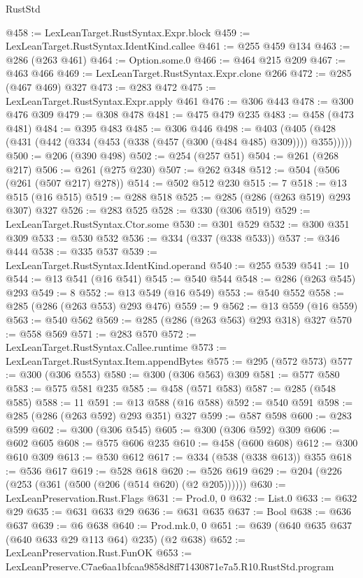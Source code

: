\begin{lexlean}{RustStd}
\begin{coremodule}
@458 := LexLeanTarget.RustSyntax.Expr.block
@459 := LexLeanTarget.RustSyntax.IdentKind.callee
@461 := @255 @459 @134
@463 := @286 (@263 @461)
@464 := Option.some.{0}
@466 := @464 @215 @209
@467 := @463 @466
@469 := LexLeanTarget.RustSyntax.Expr.clone @266
@472 := @285 (@467 @469) @327
@473 := @283 @472
@475 := LexLeanTarget.RustSyntax.Expr.apply @461
@476 := @306 @443
@478 := @300 @476 @309
@479 := @308 @478
@481 := @475 @479 @235
@483 := @458 (@473 @481)
@484 := @395 @483
@485 := @306 @446
@498 := @403 (@405 (@428 (@431 (@442 (@334 (@453 (@338 (@457 (@300 (@484 @485) @309)))) @355)))))
@500 := @206 (@390 @498)
@502 := @254 (@257 @51)
@504 := @261 (@268 @217)
@506 := @261 (@275 @230)
@507 := @262 @348
@512 := @504 (@506 (@261 (@507 @217) @278))
@514 := @502 @512 @230
@515 := 7
@518 := @13 @515 (@16 @515)
@519 := @288 @518
@525 := @285 (@286 (@263 @519) @293 @307) @327
@526 := @283 @525
@528 := @330 (@306 @519)
@529 := LexLeanTarget.RustSyntax.Ctor.some
@530 := @301 @529
@532 := @300 @351 @309
@533 := @530 @532
@536 := @334 (@337 (@338 @533))
@537 := @346 @444
@538 := @335 @537
@539 := LexLeanTarget.RustSyntax.IdentKind.operand
@540 := @255 @539
@541 := 10
@544 := @13 @541 (@16 @541)
@545 := @540 @544
@548 := @286 (@263 @545) @293
@549 := 8
@552 := @13 @549 (@16 @549)
@553 := @540 @552
@558 := @285 (@286 (@263 @553) @293 @476)
@559 := 9
@562 := @13 @559 (@16 @559)
@563 := @540 @562
@569 := @285 (@286 (@263 @563) @293 @318) @327
@570 := @558 @569
@571 := @283 @570
@572 := LexLeanTarget.RustSyntax.Callee.runtime
@573 := LexLeanTarget.RustSyntax.Item.appendBytes
@575 := @295 (@572 @573)
@577 := @300 (@306 @553)
@580 := @300 (@306 @563) @309
@581 := @577 @580
@583 := @575 @581 @235
@585 := @458 (@571 @583)
@587 := @285 (@548 @585)
@588 := 11
@591 := @13 @588 (@16 @588)
@592 := @540 @591
@598 := @285 (@286 (@263 @592) @293 @351) @327
@599 := @587 @598
@600 := @283 @599
@602 := @300 (@306 @545)
@605 := @300 (@306 @592) @309
@606 := @602 @605
@608 := @575 @606 @235
@610 := @458 (@600 @608)
@612 := @300 @610 @309
@613 := @530 @612
@617 := @334 (@538 (@338 @613)) @355
@618 := @536 @617
@619 := @528 @618
@620 := @526 @619
@629 := @204 (@226 (@253 (@361 (@500 (@206 (@514 @620) (@2 @205))))))
@630 := LexLeanPreservation.Rust.Flags
@631 := Prod.{0, 0}
@632 := List.{0}
@633 := @632 @29
@635 := @631 @633 @29
@636 := @631 @635
@637 := Bool
@638 := @636 @637
@639 := @6 @638
@640 := Prod.mk.{0, 0}
@651 := @639 (@640 @635 @637 (@640 @633 @29 @113 @64) @235) (@2 @638)
@652 := LexLeanPreservation.Rust.FunOK
@653 := LexLeanPreserve.C7ae6aa1bfcaa9858d8ff71430871e7a5.R10.RustStd.program

\end{coremodule}
\end{lexlean}
